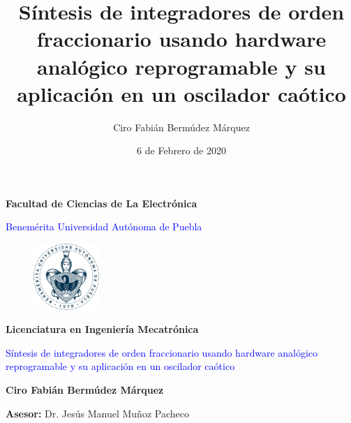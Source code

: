 \documentclass[10pt]{beamer}
\author{Ciro Fabián Bermúdez Márquez}
\title{Síntesis de integradores de orden fraccionario usando hardware analógico reprogramable y su aplicación en un oscilador caótico}
\institute{Benemérita Universidad Autónoma de Puebla} \date{6 de Febrero de 2020}
\begin{document}
	\begin{frame}[plain]
	
		\begin{center}
			\textbf{Facultad de Ciencias de La Electrónica}
		\end{center}
		
		\begin{center}
			\textcolor{blue}{Benemérita Universidad Autónoma de Puebla}
		\end{center}
		
		\begin{figure}[hbtp]
			\centering
			\includegraphics[width = 2.5cm]{logobuap.png} 
		\end{figure}
		
		\begin{center}
			\textbf{Licenciatura en Ingeniería Mecatrónica}
		\end{center}
						
		\begin{center}
			\begin{Large}
			\textcolor{blue}{Síntesis de integradores de orden fraccionario usando hardware analógico reprogramable y su aplicación en un oscilador caótico}
			\end{Large}
		\end{center}
		
		\begin{center}
			\textbf{Ciro Fabián Bermúdez Márquez }
		\end{center}
		
		\begin{center}
			\textbf{Asesor:} Dr. Jesús Manuel Muñoz Pacheco
		\end{center}
	\end{frame}
	\begin{frame}
		\tableofcontents
	\end{frame}
\end{document}
